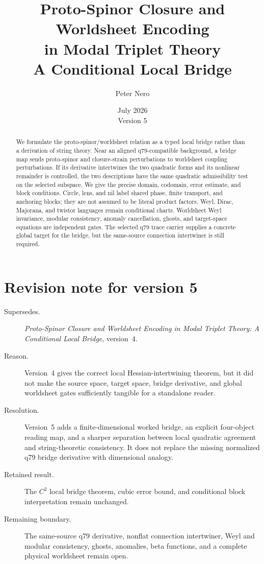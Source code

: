 \documentclass[11pt]{article}
\title{Proto-Spinor Closure and Worldsheet Encoding\\
in Modal Triplet Theory\\
\large A Conditional Local Bridge}
\author{Peter Nero}
\date{July 2026\\Version 5}
\begin{document}
\maketitle

\begin{abstract}
We formulate the proto-spinor/worldsheet relation as a typed local bridge
rather than a derivation of string theory.  Near an aligned q79-compatible
background, a bridge map sends proto-spinor and closure-strain perturbations to
worldsheet coupling perturbations.  If its derivative intertwines the two
quadratic forms and its nonlinear remainder is controlled, the two descriptions
have the same quadratic admissibility test on the selected subspace.  We give
the precise domain, codomain, error estimate, and block conditions.  Circle,
lens, and nil label shared phase, finite transport, and anchoring blocks; they
are not assumed to be literal product factors.  Weyl, Dirac, Majorana, and
twistor languages remain conditional charts.  Worldsheet Weyl invariance,
modular consistency, anomaly cancellation, ghosts, and target-space equations
are independent gates.  The selected q79 trace carrier supplies a concrete
global target for the bridge, but the same-source connection intertwiner is
still required.
\end{abstract}

\section*{Revision note for version 5}
\begin{description}
\item[Supersedes.] \emph{Proto-Spinor Closure and Worldsheet Encoding in Modal
Triplet Theory: A Conditional Local Bridge}, version~4.
\item[Reason.] Version~4 gives the correct local Hessian-intertwining theorem,
but it did not make the source space, target space, bridge derivative, and
global worldsheet gates sufficiently tangible for a standalone reader.
\item[Resolution.] Version~5 adds a finite-dimensional worked bridge, an
explicit four-object reading map, and a sharper separation between local
quadratic agreement and string-theoretic consistency. It does not replace
the missing normalized q79 bridge derivative with dimensional analogy.
\item[Retained result.] The $C^2$ local bridge theorem, cubic error bound, and
conditional block interpretation remain unchanged.
\item[Remaining boundary.] The same-source q79 derivative, nonflat connection
intertwiner, Weyl and modular consistency, ghosts, anomalies, beta functions,
and a complete physical worldsheet remain open.
\end{description}
\end{document}

